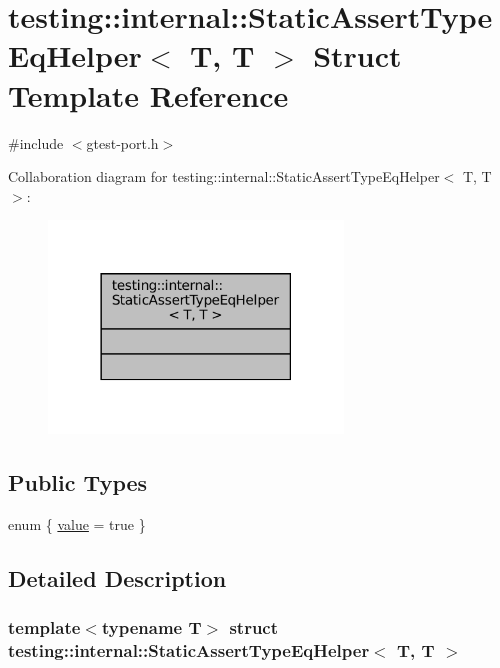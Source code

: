 \hypertarget{structtesting_1_1internal_1_1StaticAssertTypeEqHelper_3_01T_00_01T_01_4}{}\section{testing\+:\+:internal\+:\+:Static\+Assert\+Type\+Eq\+Helper$<$ T, T $>$ Struct Template Reference}
\label{structtesting_1_1internal_1_1StaticAssertTypeEqHelper_3_01T_00_01T_01_4}


{\ttfamily \#include $<$gtest-\/port.\+h$>$}



Collaboration diagram for testing\+:\+:internal\+:\+:Static\+Assert\+Type\+Eq\+Helper$<$ T, T $>$\+:
\nopagebreak
\begin{figure}[H]
\begin{center}
\leavevmode
\includegraphics[width=222pt]{structtesting_1_1internal_1_1StaticAssertTypeEqHelper_3_01T_00_01T_01_4__coll__graph}
\end{center}
\end{figure}
\subsection*{Public Types}
\begin{DoxyCompactItemize}
\item 
enum \{ \hyperlink{structtesting_1_1internal_1_1StaticAssertTypeEqHelper_3_01T_00_01T_01_4_aaa74ade0039d54d90639af147e6bdbe5a63c475f543e4e977d43c5093dd2b7f3f}{value} = true
 \}
\end{DoxyCompactItemize}


\subsection{Detailed Description}
\subsubsection*{template$<$typename T$>$\newline
struct testing\+::internal\+::\+Static\+Assert\+Type\+Eq\+Helper$<$ T, T $>$}



